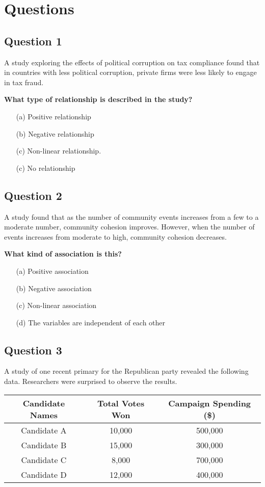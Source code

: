 \documentclass[11pt]{article}
\begin{document}
\newpage

\section*{Questions}

\subsection*{Question 1}
A study exploring the effects of political corruption on tax compliance found that in countries with less political corruption, private firms were less likely to engage in tax fraud.

\textbf{What type of relationship is described in the study?}
\begin{enumerate}
    \item[(a)] Positive relationship
    \item[(b)] Negative relationship
    \item[(c)] Non-linear relationship.
    \item[(c)] No relationship
\end{enumerate}

\subsection*{Question 2}
A study found that as the number of community events increases from a few to a moderate number, community cohesion improves. However, when the number of events increases from moderate to high, community cohesion decreases.

\textbf{What kind of association is this?}
\begin{enumerate}
    \item[(a)] Positive association
    \item[(b)] Negative association
    \item[(c)] Non-linear association
    \item[(d)] The variables are independent of each other
\end{enumerate}

\subsection*{Question 3}
A study of one recent primary for the Republican party revealed the following data. Researchers were surprised to observe the results.

\begin{table}[h!]
\centering
\begin{tabular}{|c|c|c|}
    \hline
    \textbf{Candidate Names} & \textbf{Total Votes Won} & \textbf{Campaign Spending (\$)} \\
    \hline
    Candidate A & 10,000 & 500,000 \\
    Candidate B & 15,000 & 300,000 \\
    Candidate C & 8,000 & 700,000 \\
    Candidate D & 12,000 & 400,000 \\
    \hline
\end{tabular}
\end{table}
\end{document}
